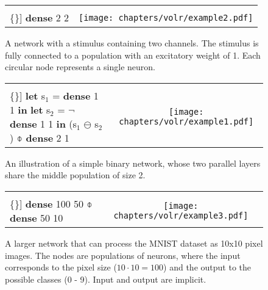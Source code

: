 
\begin{figure}
  \ContinuedFloat*
  \begin{tabular}[t]{l c}
    \begin{minipage}{0.4\textwidth}
      \begin{Verbatim}[mathescape,commandchars=\\\{\}]
\textbf{dense} 2 2
      \end{Verbatim}
    \end{minipage} & \begin{minipage}{0.4\textwidth}
      \texttt{[image: chapters/volr/example2.pdf]}
    \end{minipage}

  \end{tabular}
  \caption{A network with a stimulus containing two channels.
    The stimulus is fully connected to a population with an excitatory
    weight of 1. Each circular node represents a single neuron.}
  \label{fig:volr-example1}
\end{figure}

\begin{figure}
  \ContinuedFloat
  \begin{tabular}[t]{l c}
    \begin{minipage}{0.4\textwidth}
      \begin{Verbatim}[mathescape,commandchars=\\\{\}]
\textbf{let} s$_1$ = \textbf{dense} 1 1 \textbf{in}
\textbf{let} s$_2$ = $\neg$ \textbf{dense} 1 1 \textbf{in}
(s$_1$ $\ominus$ s$_2$) $\obar$ \textbf{dense} 2 1
      \end{Verbatim}
    \end{minipage} & \begin{minipage}{0.6\textwidth}
      \texttt{[image: chapters/volr/example1.pdf]}
    \end{minipage}
  \end{tabular}
  \caption{An illustration of a simple binary network, whose two 
	   parallel layers share the middle population of size 2.}
\end{figure}

\begin{figure}
  \ContinuedFloat
  \begin{tabular}[t]{l c}
    \begin{minipage}[b]{0.4\textwidth}
      \begin{Verbatim}[mathescape,commandchars=\\\{\}]
      \textbf{dense} 100 50
        $\obar$ \textbf{dense} 50 10
      \end{Verbatim}
    \end{minipage} & \begin{minipage}{0.5\textwidth}
      \texttt{[image: chapters/volr/example3.pdf]}
    \end{minipage}
  \end{tabular}
  \caption{A larger network that can process the MNIST dataset
    as 10x10 pixel images. 
    The nodes are populations of neurons,
    where the input corresponds to the pixel size ($10\cdot10=100$) 
    and the output to the possible classes (0 - 9).
    Input and output are implicit.}
\end{figure}

